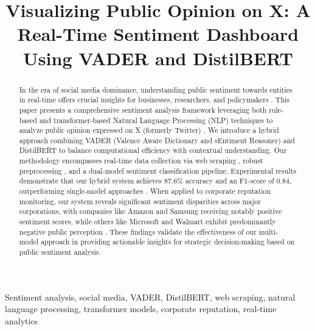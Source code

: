 \documentclass[conference]{IEEEtran}
\begin{document}
\title{Visualizing Public Opinion on X: A Real-Time Sentiment Dashboard Using VADER and DistilBERT}

\author{
}

\maketitle

\begin{abstract}
In the era of social media dominance, understanding public sentiment towards entities in real-time offers crucial insights for businesses, researchers, and policymakers \cite{rodriguez2023review, zhang2023sa}. This paper presents a comprehensive sentiment analysis framework leveraging both rule-based and transformer-based Natural Language Processing (NLP) techniques to analyze public opinion expressed on X (formerly Twitter) \cite{go2009twitter, bertweet2023}. We introduce a hybrid approach combining VADER (Valence Aware Dictionary and sEntiment Reasoner) \cite{hutto2014vader} and DistilBERT \cite{sanh2019distilbert} to balance computational efficiency with contextual understanding. Our methodology encompasses real-time data collection via web scraping \cite{techrxiv2024scraping}, robust preprocessing \cite{churchill2021preprocessing, igi2022preprocessing}, and a dual-model sentiment classification pipeline. Experimental results demonstrate that our hybrid system achieves 87.6\% accuracy and an F1-score of 0.84, outperforming single-model approaches \cite{rahman2024roberta, singh2023emlsa}. When applied to corporate reputation monitoring, our system reveals significant sentiment disparities across major corporations, with companies like Amazon and Samsung receiving notably positive sentiment scores, while others like Microsoft and Walmart exhibit predominantly negative public perception \cite{vorecol2024reputation, edelman2023trust}. These findings validate the effectiveness of our multi-model approach in providing actionable insights for strategic decision-making based on public sentiment analysis.
\end{abstract}

\begin{IEEEkeywords}
Sentiment analysis, social media, VADER, DistilBERT, web scraping, natural language processing, transformer models, corporate reputation, real-time analytics
\end{IEEEkeywords}
\end{document}
